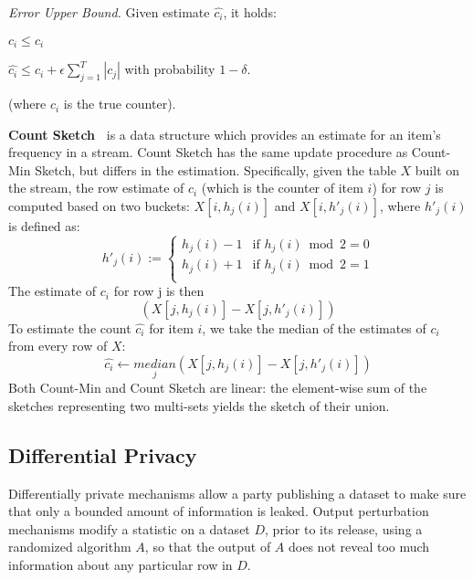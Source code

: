 \documentclass[conference]{IEEEtran}
\newcommand{\descr}[1]{\medskip \noindent \textbf{#1}}
\newcommand{\descrit}[1]{\smallskip \noindent \emph{#1}}
\begin{document}
\descrit{Error Upper Bound.} Given estimate $\hat{c_i}$, it holds: \begin{compactenum}
\item $c_i \leq \hat{c_i} $
\item $\hat{c_i} \leq c_i + \epsilon \sum_{j=1}^{T} |c_j|$  with probability $1-\delta$.
\end{compactenum}
(where $c_i$ is the true counter).




\descr{Count Sketch~\cite{charikar2002finding}} is a data structure which provides an estimate for an item's frequency in a stream. Count Sketch has the same update procedure as Count-Min Sketch, but differs in the estimation.
Specifically, given the table $X$ built on the stream, the row estimate of $c_i$ (which is the counter of item $i$) for row $j$ is computed based on two buckets: $X[i,h_j(i)]$ and $X[i,h'_j(i)]$, where $h'_j(i)$ is defined as: \vspace{-0.15cm}
\begin{equation*}
h'_{j}(i) := \begin{cases}
				h_j(i) - 1 & \text{if } h_j(i) \bmod 2 = 0 \\
				h_j(i) + 1 & \text{if } h_j(i) \bmod 2 = 1 \\
			  \end{cases} \end{equation*}
The estimate of $c_i$ for row j is then $$\left( X[j,h_j(i)] - X[j,h'_j(i)] \right)$$
To estimate the count $\hat{c_i}$ for item $i$, we take the median of the estimates of $c_i$ from every row of $X$:\vspace{-0.1cm} 
\[
 \hat{c_i} \gets \underset{j}{\mathit{median}} \left( X[j,h_j(i)] - X[j,h'_j(i)] \right) \]
Both Count-Min and Count Sketch are linear: the element-wise sum of the sketches representing two multi-sets yields the sketch of their union.











\subsection{Differential Privacy}
\label{sec:diffPrivacy}

Differentially private mechanisms allow a party publishing a dataset to make sure that only a bounded amount of information is leaked. Output perturbation mechanisms modify a statistic on a dataset $D$, prior to its release, using a randomized algorithm $A$, so that the output of $A$ does not reveal too much information about any particular row in $D$. 
\end{document}
